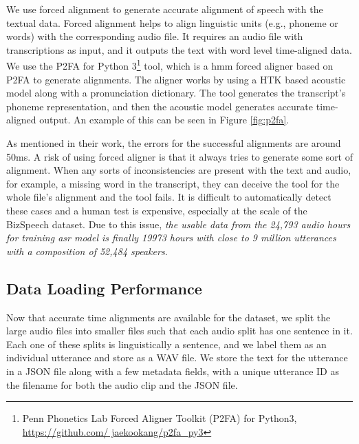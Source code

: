We use forced alignment to generate accurate alignment of speech with the textual data. Forced alignment helps to align linguistic units (e.g., phoneme or words) with the corresponding audio file. It requires an audio file with transcriptions as input, and it outputs the text with word level time-aligned data. We use the P2FA for Python 3\footnote{Penn Phonetics Lab Forced Aligner Toolkit (P2FA) for Python3, \href{https://github.com/jaekookang/p2fa\_py3}{https://github.com/ jaekookang/p2fa\_py3}} tool, which is a \acrshort{hmm} forced aligner based on P2FA \cite{Yuan2008SPEAKERCORPUS} to generate alignments. The aligner works by using a HTK \cite{Young2002TheBook} based acoustic model along with a pronunciation dictionary. The tool generates the transcript's phoneme representation, and then the acoustic model generates accurate time-aligned output. An example of this can be seen in Figure \ref{fig:p2fa}.

As mentioned in their work, the errors for the successful alignments are around 50ms. A risk of using forced aligner is that it always tries to generate some sort of alignment. When any sorts of inconsistencies are present with the text and audio, for example, a missing word in the transcript, they can deceive the tool for the whole file's alignment and the tool fails. It is difficult to automatically detect these cases and a human test is expensive, especially at the scale of the BizSpeech dataset. Due to this issue, \emph{the usable data from the 24,793 audio hours for training \acrshort{asr} model is finally 19973 hours with close to 9 million utterances with a composition of 52,484 speakers.}

\subsection{Data Loading Performance}
Now that accurate time alignments are available for the dataset, we split the large audio files into smaller files such that each audio split has one sentence in it. Each one of these splits is linguistically a sentence, and we label them as an individual utterance and store as a WAV file. We store the text for the utterance in a JSON file along with a few metadata fields, with a unique utterance ID as the filename for both the audio clip and the JSON file. 



